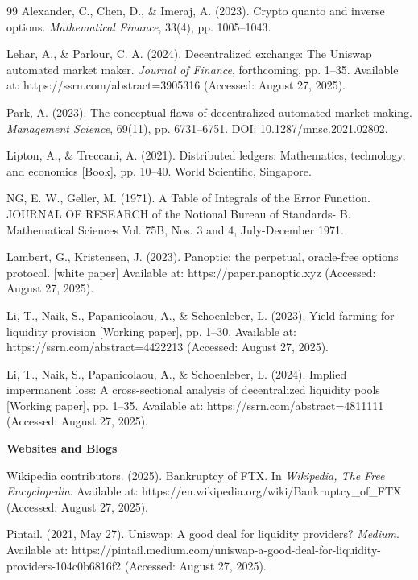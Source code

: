 \documentclass{article}
\begin{document}
\begin{thebibliography}{99}
Alexander, C., Chen, D., \& Imeraj, A. (2023). Crypto quanto and inverse options. \textit{Mathematical Finance}, 33(4), pp. 1005--1043.

Lehar, A., \& Parlour, C. A. (2024). Decentralized exchange: The Uniswap automated market maker. \textit{Journal of Finance}, forthcoming, pp. 1--35. Available at: https://ssrn.com/abstract=3905316 (Accessed: August 27, 2025).

Park, A. (2023). The conceptual flaws of decentralized automated market making. \textit{Management Science}, 69(11), pp. 6731--6751. DOI: 10.1287/mnsc.2021.02802.

Lipton, A., \& Treccani, A. (2021). Distributed ledgers: Mathematics, technology, and economics [Book], pp. 10--40. World Scientific, Singapore.

NG, E. W., Geller, M. (1971). A Table of Integrals of the Error Function. JOURNAL OF RESEARCH of the Notional Bureau of Standards- B. Mathematical Sciences Vol. 75B, Nos. 3 and 4, July-December 1971.

Lambert, G., Kristensen, J. (2023). Panoptic: the perpetual, oracle-free options protocol. [white paper] Available at: https://paper.panoptic.xyz (Accessed: August 27, 2025).

Li, T., Naik, S., Papanicolaou, A., \& Schoenleber, L. (2023). Yield farming for liquidity provision [Working paper], pp. 1--30. Available at: https://ssrn.com/abstract=4422213 (Accessed: August 27, 2025).

Li, T., Naik, S., Papanicolaou, A., \& Schoenleber, L. (2024). Implied impermanent loss: A cross-sectional analysis of decentralized liquidity pools [Working paper], pp. 1--35. Available at: https://ssrn.com/abstract=4811111 (Accessed: August 27, 2025).



\newpage
\item[] \textbf{Websites and Blogs}

Wikipedia contributors. (2025). Bankruptcy of FTX. In \textit{Wikipedia, The Free Encyclopedia}. Available at: https://en.wikipedia.org/wiki/Bankruptcy\_of\_FTX (Accessed: August 27, 2025).

Pintail. (2021, May 27). Uniswap: A good deal for liquidity providers? \textit{Medium}. Available at: https://pintail.medium.com/uniswap-a-good-deal-for-liquidity-providers-104c0b6816f2 (Accessed: August 27, 2025).


\end{thebibliography}
\end{document}
